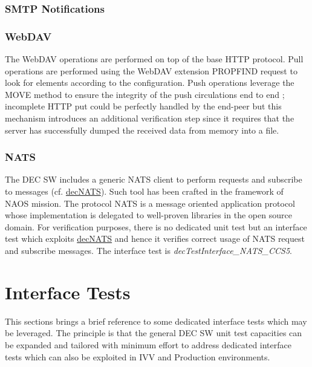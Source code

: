 \documentclass[dec_sum_main.tex]{subfiles}
\begin{document}
 \newline

 \newline

\subsubsection{SMTP Notifications}

\subsubsection{WebDAV}
The WebDAV operations are performed on top of the base HTTP protocol. Pull operations are performed using the WebDAV extension PROPFIND request to look for elements according to the configuration.
Push operations leverage the MOVE method to ensure the integrity of the push circulations end to end ; incomplete HTTP put could be perfectly handled by the end-peer but this mechanism introduces an additional verification step since it requires that the server has successfully dumped the received data from memory into a file. \newline

 \newline

\subsubsection{NATS}
The DEC SW includes a generic NATS client to perform requests and subscribe to messages (cf. \hyperref[decNATS]{decNATS}). Such tool has been crafted in the framework of NAOS mission. The protocol NATS is a message oriented application protocol whose implementation is delegated to well-proven libraries in the open source domain. For verification purposes, there is no dedicated unit test but an interface test which exploits \hyperref[decNATS]{decNATS} and hence it verifies correct usage of NATS request and subscribe messages. The interface test is \textit{decTestInterface\_NATS\_CCS5}.

\section{Interface Tests}
This sections brings a brief reference to some dedicated interface tests which may be leveraged. The principle is that the general DEC SW unit test capacities can be expanded and tailored with minimum effort to address dedicated interface tests which can also be exploited in IVV and Production environments. \newline
\end{document}

